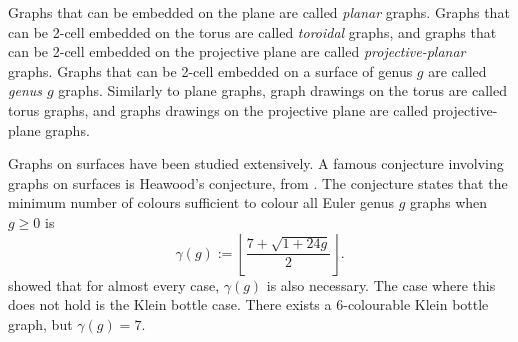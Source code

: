 Graphs that can be embedded on the plane are called \textit{planar} graphs. Graphs that can be 2-cell embedded on the torus are called \textit{toroidal} graphs, and graphs that can be 2-cell embedded on the projective plane are called \textit{projective-planar} graphs. Graphs that can be 2-cell embedded on a surface of genus $g$ are called \textit{genus $g$} graphs. Similarly to plane graphs, graph drawings on the torus are called torus graphs, and graphs drawings on the projective plane are called projective-plane graphs. 

Graphs on surfaces have been studied extensively. A famous conjecture involving graphs on surfaces is Heawood's conjecture, from \textcite{heawoodMapcolourTheorem1890}. The conjecture states that the minimum number of colours sufficient to colour all Euler genus $g$ graphs when $g \geq 0$ is
	\begin{equation*}
		\gamma(g) := \left\lfloor 
		\frac{7 + \sqrt{1 + 24g}}{2}
		\right\rfloor.
	\end{equation*}
\textcite{ringelMapColorTheorem1974} showed that for almost every case, $\gamma(g)$ is also necessary. The case where this does not hold is the Klein bottle case. There exists a 6-colourable Klein bottle graph, but $\gamma(g) = 7$. 